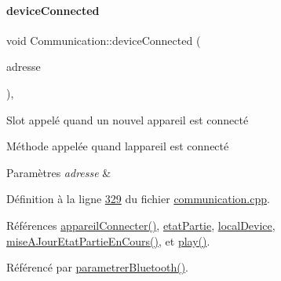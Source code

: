 \paragraph{\texorpdfstring{device\+Connected}{deviceConnected}}
{\footnotesize\ttfamily void Communication\+::device\+Connected (\begin{DoxyParamCaption}\item[{const Q\+Bluetooth\+Address \&}]{adresse }\end{DoxyParamCaption})\hspace{0.3cm}{\ttfamily [private]}, {\ttfamily [slot]}}



Slot appelé quand un nouvel appareil est connecté 

Méthode appelée quand l\textquotesingle{}appareil est connecté


\begin{DoxyParams}{Paramètres}
{\em adresse} & \\
\hline
\end{DoxyParams}


Définition à la ligne \hyperlink{communication_8cpp_source_l00329}{329} du fichier \hyperlink{communication_8cpp_source}{communication.\+cpp}.



Références \hyperlink{class_communication_ae05ddbb1481cfb64f493940b6db8ed29}{appareil\+Connecter()}, \hyperlink{communication_8h_source_l00100}{etat\+Partie}, \hyperlink{communication_8h_source_l00096}{local\+Device}, \hyperlink{communication_8cpp_source_l00415}{mise\+A\+Jour\+Etat\+Partie\+En\+Cours()}, et \hyperlink{class_communication_a2645730b88adec069200debe05d212c3}{play()}.



Référencé par \hyperlink{communication_8cpp_source_l00059}{parametrer\+Bluetooth()}.


